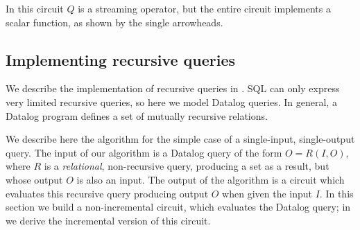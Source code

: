 In this circuit $Q$ is a streaming operator, but the entire circuit
implements a scalar function, as shown by the single arrowheads.


\subsection{Implementing recursive queries}\label{sec:datalog}

We describe the implementation of recursive queries in \dbsp.  SQL can
only express very limited recursive queries, so here we model Datalog
queries.  In general, a Datalog program defines a set of mutually
recursive relations.

We describe here the algorithm for the simple case of a single-input,
single-output query.  The input of our algorithm is a Datalog query of
the form $O = R(I, O)$, where $R$ is a \emph{relational},
non-recursive query, producing a set as a result, but whose output $O$
is also an input.  The output of the algorithm is a \dbsp circuit
which evaluates this recursive query producing output $O$ when given
the input $I$.  In this section we build a non-incremental circuit,
which evaluates the Datalog query; in  we derive
the incremental version of this circuit.

